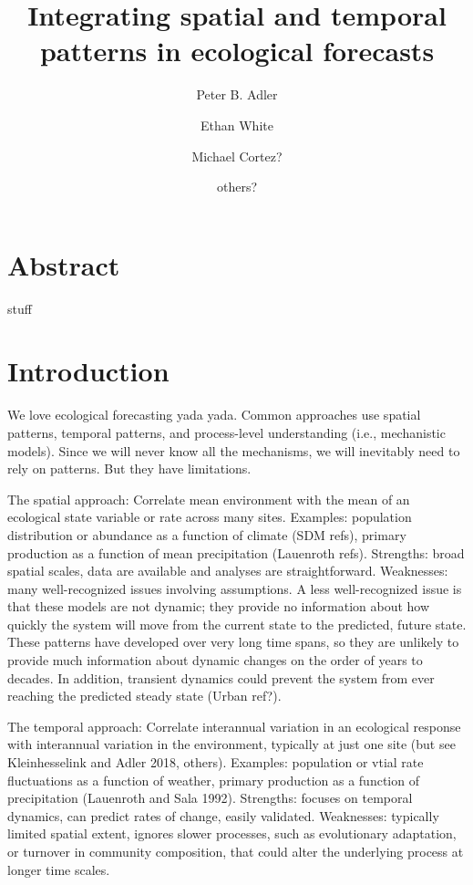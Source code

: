 \documentclass[11pt]{article}
\title{Integrating spatial and temporal patterns in ecological forecasts }
\author[1]{Peter B. Adler}  %
\author[2]{Ethan White}
\author[3]{Michael Cortez?}
\author[4]{others?}
\affil[1]{Department of Wildland Resources and the Ecology Center, Utah State University, Logan, Utah}
\affil[2]{some shitty Florida joint}
\begin{document}
\maketitle

\linenumbers

\section*{Abstract}

stuff


\section*{Introduction}

We love ecological forecasting yada yada. Common approaches use spatial patterns, temporal patterns, and process-level understanding (i.e., mechanistic models). Since we will never know all the mechanisms, we will inevitably need to rely on patterns. But they have limitations.

The spatial approach: Correlate mean environment with the mean of an ecological state variable or rate across many sites. Examples: population distribution or abundance as a function of climate (SDM refs), primary production as a function of mean precipitation (Lauenroth refs).  Strengths: broad spatial scales, data are available and analyses are straightforward. Weaknesses: many well-recognized issues involving assumptions. A less well-recognized issue is that these models are not dynamic; they provide no information about how quickly the system will move from the current state to the predicted, future state. These patterns have developed over very long time spans, so they are unlikely to provide much information about dynamic changes on the order of years to decades. In addition, transient dynamics could prevent the system from ever reaching the predicted steady state (Urban ref?). 

The temporal approach: Correlate interannual variation in an ecological response with interannual variation in the environment, typically at just one site (but see Kleinhesselink  and Adler 2018, others). Examples: population or vtial rate fluctuations as a function of weather, primary production as a function of precipitation (Lauenroth and Sala 1992). Strengths: focuses on temporal dynamics, can predict rates of change, easily validated. Weaknesses: typically limited spatial extent, ignores slower processes, such as evolutionary adaptation, or turnover in community composition, that could alter the underlying process at longer time scales.
\end{document}
